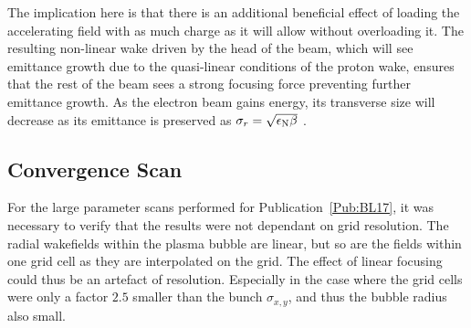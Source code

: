 The implication here is that there is an additional beneficial effect of loading the accelerating field with as much charge as it will allow without overloading it. The resulting non-linear wake driven by the head of the beam, which will see emittance growth due to the quasi-linear conditions of the proton wake, ensures that the rest of the beam sees a strong focusing force preventing further emittance growth. As the electron beam gains energy, its transverse size will decrease as its emittance is preserved as $\sigma_{r} = \sqrt{\epsilon_{\mathrm{N}}\beta}$ \cite{wille:2001}.

\subsection{Convergence Scan}
\label{Sim:Converge}

For the large parameter scans performed for Publication~\ref{Pub:BL17}, it was necessary to verify that the results were not dependant on grid resolution.
The radial wakefields within the plasma bubble are linear, but so are the fields within one grid cell as they are interpolated on the grid.
The effect of linear focusing could thus be an artefact of resolution.
Especially in the case where the grid cells were only a factor $2.5$ smaller than the bunch $\sigma_{x,y}$, and thus the bubble radius also small.


